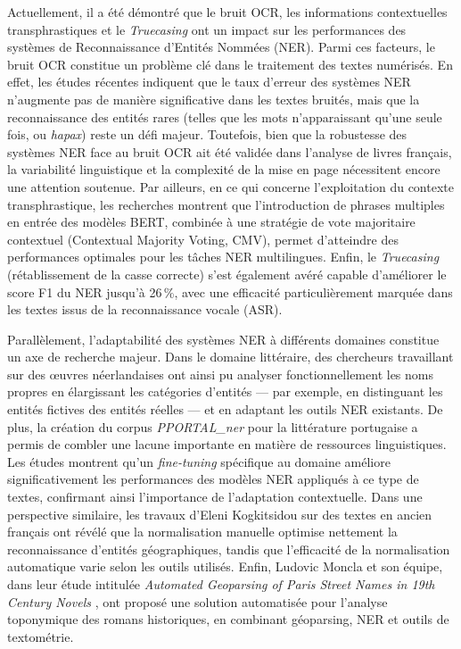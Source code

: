 Actuellement, il a été démontré que le bruit OCR, les informations contextuelles transphrastiques et le \textit{Truecasing} ont un impact sur les performances des systèmes de Reconnaissance d'Entités Nommées (NER). Parmi ces facteurs, le bruit OCR constitue un problème clé dans le traitement des textes numérisés. En effet, les études récentes indiquent que le taux d’erreur des systèmes NER n'augmente pas de manière significative dans les textes bruités, mais que la reconnaissance des entités rares (telles que les mots n'apparaissant qu'une seule fois, ou \textit{hapax}) reste un défi majeur. Toutefois, bien que la robustesse des systèmes NER face au bruit OCR ait été validée dans l'analyse de livres français, la variabilité linguistique et la complexité de la mise en page nécessitent encore une attention soutenue. Par ailleurs, en ce qui concerne l'exploitation du contexte transphrastique, les recherches montrent que l'introduction de phrases multiples en entrée des modèles BERT, combinée à une stratégie de vote majoritaire contextuel (Contextual Majority Voting, CMV), permet d'atteindre des performances optimales pour les tâches NER multilingues. Enfin, le \textit{Truecasing} (rétablissement de la casse correcte) s'est également avéré capable d'améliorer le score F1 du NER jusqu'à 26\,\%, avec une efficacité particulièrement marquée dans les textes issus de la reconnaissance vocale (ASR).

Parallèlement, l'adaptabilité des systèmes NER à différents domaines constitue un axe de recherche majeur. Dans le domaine littéraire, des chercheurs travaillant sur des œuvres néerlandaises ont ainsi pu analyser fonctionnellement les noms propres en élargissant les catégories d'entités — par exemple, en distinguant les entités fictives des entités réelles — et en adaptant les outils NER existants. De plus, la création du corpus \textit{PPORTAL\_ner} pour la littérature portugaise a permis de combler une lacune importante en matière de ressources linguistiques. Les études montrent qu'un \textit{fine-tuning} spécifique au domaine améliore significativement les performances des modèles NER appliqués à ce type de textes, confirmant ainsi l'importance de l'adaptation contextuelle. Dans une perspective similaire, les travaux d'Eleni Kogkitsidou sur des textes en ancien français ont révélé que la normalisation manuelle optimise nettement la reconnaissance d'entités géographiques, tandis que l'efficacité de la normalisation automatique varie selon les outils utilisés. Enfin, Ludovic Moncla et son équipe, dans leur étude intitulée \textit{Automated Geoparsing of Paris Street Names in 19th Century Novels} \cite{10.1145/3149858.3149859}, ont proposé une solution automatisée pour l'analyse toponymique des romans historiques, en combinant géoparsing, NER et outils de textométrie.


